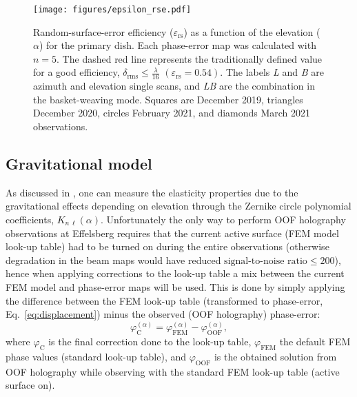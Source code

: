 \documentclass[
    ]
    {aa}
\begin{document}
    \begin{figure}[t]
        \centering
        \texttt{[image: figures/epsilon\_rse.pdf]}
        \caption{Random-surface-error efficiency ($\varepsilon_\text{rs}$) as  a function of the elevation ($\alpha$) for the primary dish. Each phase-error map was calculated with $n=5$.
        The dashed red line represents the traditionally defined value for a good efficiency, $\delta_\text{rms}\leq\frac{\lambda}{16}$ $(\varepsilon_\text{rs}=0.54)$. The labels \textit{L} and \textit{B} are azimuth and elevation single scans, and \textit{LB} are the combination in the basket-weaving mode. Squares are December 2019,  triangles December 2020, circles February 2021, and diamonds March 2021 observations.}
        \label{fig:epsilon_rse}
    \end{figure}

    \subsection{Gravitational model}
    \label{sec:gravitational_model}

    As discussed in \cite{2007A&A...465..685N}, one can measure the elasticity properties due to the gravitational effects depending on elevation through the Zernike circle polynomial coefficients, $K_{n\,\ell}(\alpha)$. 
    Unfortunately the only way to perform OOF holography observations at Effelsberg requires that the current active surface (FEM model look-up table) had to be turned on during the entire observations (otherwise degradation in the beam maps would have reduced $\text{signal-to-noise ratio} \leq200$), hence when applying corrections to the look-up table a mix between the current FEM model and phase-error maps will be used. This is done by simply applying the difference between the FEM look-up table (transformed to phase-error, Eq.~\ref{eq:displacement}) minus the observed (OOF holography) phase-error:
    \begin{equation}
        \varphi^{(\alpha)}_\text{C} = \varphi^{(\alpha)}_\text{FEM} - \varphi^{(\alpha)}_{\text{OOF}},
        \label{eq:fem-oof}
    \end{equation}
    where $\varphi_\text{C}$ is the final correction done to the look-up table, $\varphi_\text{FEM}$ the default FEM phase values (standard look-up table), and $\varphi_{\text{OOF}}$ is the obtained solution from OOF holography while observing with the standard FEM look-up table (active surface on).
\end{document}
